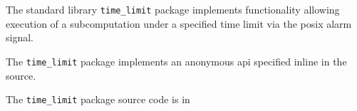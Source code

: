
The standard library {\tt time\_limit} package implements functionality allowing execution of 
a subcomputation under a specified time limit via the posix alarm signal.

The {\tt time\_limit} package implements an anonymous api specified inline in the source.

The {\tt time\_limit} package source code is in 

